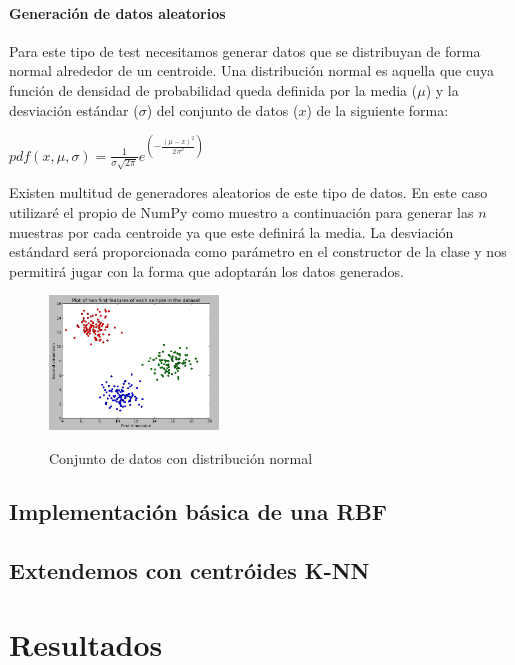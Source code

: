 \documentclass[10pt,a4paper, twocolumn]{report}
\begin{document}
\subsubsection{Generación de datos aleatorios}
Para este tipo de test necesitamos generar datos que se distribuyan de forma normal alrededor de un centroide. Una distribución normal es aquella que cuya función de densidad de probabilidad queda definida por la media ($\mu$) y la desviación estándar ($\sigma$) del conjunto de datos ($x$) de la siguiente forma:
\begin{center}
$pdf(x,\mu,\sigma) = \frac{1}{ \sigma \sqrt{2 \pi}} e^{\left(-\frac{{\left(\mu - x\right)}^{2}}{2 \, \sigma^{2}}\right)}$
\end{center} 
Existen multitud de generadores aleatorios de este tipo de datos. En este caso utilizaré el propio de NumPy como muestro a continuación para generar las $n$ muestras por cada centroide ya que este definirá la media. La desviación estándard será proporcionada como parámetro en el constructor de la clase y nos permitirá jugar con la forma que adoptarán los datos generados.

\begin{figure}[!h]{}
    \centering
    \includegraphics[width=0.4\textwidth]{img/clusteredData1.png}
    \label{fig:clusteredData1}
    \caption{Conjunto de datos con distribución normal}
\end{figure}
\section{Implementación básica de una RBF}

\section{Extendemos con centróides K-NN}

\chapter{Resultados}
\end{document}
